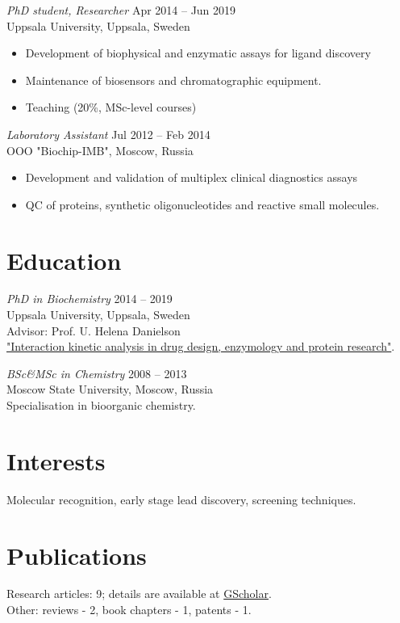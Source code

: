 \documentclass[margin]{res}
\begin{document}
\begin{resume}
{\sl PhD student, Researcher} \hfill Apr 2014 -- Jun 2019 \\
Uppsala University, Uppsala, Sweden
\begin{itemize}
\setlength\itemsep{0em}
\item Development of biophysical and enzymatic assays for ligand discovery
\item Maintenance of biosensors and chromatographic equipment.
\item Teaching (20\%, MSc-level courses)
\end{itemize}

{\sl Laboratory Assistant} \hfill Jul 2012 -- Feb 2014 \\
OOO "Biochip-IMB", Moscow, Russia
\begin{itemize}
\setlength\itemsep{0em}
\item Development and validation of multiplex clinical diagnostics assays
\item QC of proteins, synthetic oligonucleotides and reactive small molecules.
\end{itemize}
 
\section{Education} {\sl PhD in Biochemistry} \hfill 2014 -- 2019 \\
Uppsala University, Uppsala, Sweden \\
Advisor: Prof. U. Helena Danielson \\
\href{http://uu.diva-portal.org/smash/record.jsf?pid=diva2%3A1256395&dswid=214}{"Interaction kinetic analysis in drug design, enzymology and protein research"}.

{\sl BSc\&MSc in Chemistry} \hfill 2008 -- 2013 \\
Moscow State University, Moscow, Russia \\
Specialisation in bioorganic chemistry.
                
\section{Interests} Molecular recognition, early stage lead discovery, screening techniques.

\section{Publications}
\nocite{*}
Research articles: 9; details are available at \href{https://scholar.google.com/citations?hl=sv&user=H5uK2zsAAAAJ&view_op=list_works&authuser=2&sortby=pubdate}{GScholar}.\\
Other: reviews - 2, book chapters - 1, patents  - 1.\\
\printbibliography[heading=none]
\end{resume}
\end{document}
